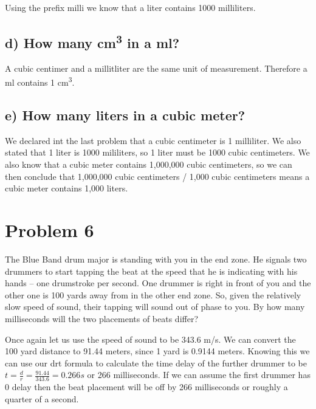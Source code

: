 \documentclass[]{article}
\begin{document}
Using the prefix milli we know that a liter contains 1000 milliliters.

\subsection{\texorpdfstring{d) How many cm\textsuperscript{3} in a
ml?}{d) How many cm3 in a ml?}}\label{d-how-many-cm3-in-a-ml}

A cubic centimer and a millitliter are the same unit of measurement.
Therefore a ml contains 1 cm\textsuperscript{3}.

\subsection{e) How many liters in a cubic
meter?}\label{e-how-many-liters-in-a-cubic-meter}

We declared int the last problem that a cubic centimeter is 1
milliliter. We also stated that 1 liter is 1000 mililiters, so 1 liter
must be 1000 cubic centimeters. We also know that a cubic meter contains
1,000,000 cubic centimeters, so we can then conclude that 1,000,000
cubic centimeters / 1,000 cubic centimeters means a cubic meter contains
1,000 liters.

\section{Problem 6}\label{problem-6}

The Blue Band drum major is standing with you in the end zone. He
signals two drummers to start tapping the beat at the speed that he is
indicating with his hands -- one drumstroke per second. One drummer is
right in front of you and the other one is 100 yards away from in the
other end zone. So, given the relatively slow speed of sound, their
tapping will sound out of phase to you. By how many milliseconds will
the two placements of beats differ?

Once again let us use the speed of sound to be 343.6 m/s. We can convert
the 100 yard distance to 91.44 meters, since 1 yard is 0.9144 meters.
Knowing this we can use our drt formula to calculate the time delay of
the further drummer to be
\(t = \frac{d}{r} = \frac{91.44}{343.6} = 0.266 s\) or 266 milliseconds.
If we can assume the first drummer has 0 delay then the beat placement
will be off by 266 milliseconds or roughly a quarter of a second.
\end{document}
